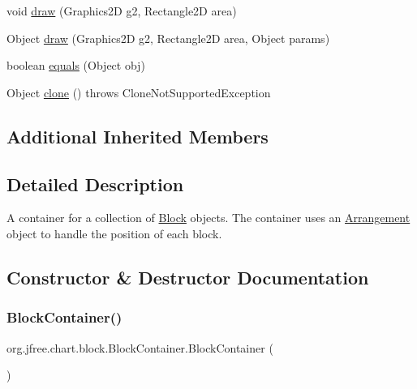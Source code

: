 \begin{DoxyCompactItemize}
\item 
void \mbox{\hyperlink{classorg_1_1jfree_1_1chart_1_1block_1_1_block_container_a50c5f0ce11d78284655354450fcc9ca0}{draw}} (Graphics2D g2, Rectangle2D area)
\item 
Object \mbox{\hyperlink{classorg_1_1jfree_1_1chart_1_1block_1_1_block_container_ac2c5279f4ac5b5e89e48d11b195938a2}{draw}} (Graphics2D g2, Rectangle2D area, Object params)
\item 
boolean \mbox{\hyperlink{classorg_1_1jfree_1_1chart_1_1block_1_1_block_container_a8945b16bf015b60fdf5b933de15d45a4}{equals}} (Object obj)
\item 
Object \mbox{\hyperlink{classorg_1_1jfree_1_1chart_1_1block_1_1_block_container_a3e852a0973be203fe120e358c1a03938}{clone}} ()  throws Clone\+Not\+Supported\+Exception 
\end{DoxyCompactItemize}
\subsection*{Additional Inherited Members}


\subsection{Detailed Description}
A container for a collection of \mbox{\hyperlink{interfaceorg_1_1jfree_1_1chart_1_1block_1_1_block}{Block}} objects. The container uses an \mbox{\hyperlink{interfaceorg_1_1jfree_1_1chart_1_1block_1_1_arrangement}{Arrangement}} object to handle the position of each block. 

\subsection{Constructor \& Destructor Documentation}
\mbox{\label{classorg_1_1jfree_1_1chart_1_1block_1_1_block_container_a34bd371757c53973701b501011276993}} 
\subsubsection{\texorpdfstring{Block\+Container()}{BlockContainer()}\hspace{0.1cm}{\footnotesize\ttfamily [1/2]}}
{\footnotesize\ttfamily org.\+jfree.\+chart.\+block.\+Block\+Container.\+Block\+Container (\begin{DoxyParamCaption}{ }\end{DoxyParamCaption})}

